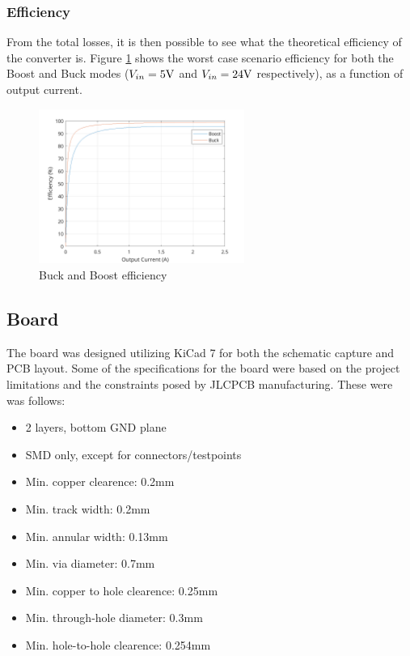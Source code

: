 \documentclass[11pt, a4paper]{article}
\begin{document}
\subsubsection{Efficiency}

From the total losses, it is then possible to see what the theoretical efficiency of the converter is. Figure \ref{fig:efficiency} shows the worst case scenario efficiency for both the Boost and Buck modes ($V_{in} = 5\text V$ and $V_{in} = 24\text V$ respectively), as a function of output current.

\begin{figure}[H]
    \centering
    \includegraphics[width=0.6\textwidth]{./figures/efficiency.png}
    \caption{Buck and Boost efficiency}
    \label{fig:efficiency}
\end{figure}

\subsection{Board}

The board was designed utilizing KiCad 7 for both the schematic capture and PCB layout. Some of the specifications for the board were based on the project limitations and the constraints posed by JLCPCB manufacturing. These were was follows:

\begin{itemize}
    \item 2 layers, bottom GND plane
    \item SMD only, except for connectors/testpoints
    \item Min. copper clearence: 0.2mm
    \item Min. track width: 0.2mm
    \item Min. annular width: 0.13mm
    \item Min. via diameter: 0.7mm
    \item Min. copper to hole clearence: 0.25mm
    \item Min. through-hole diameter: 0.3mm
    \item Min. hole-to-hole clearence: 0.254mm
\end{itemize}
\end{document}
